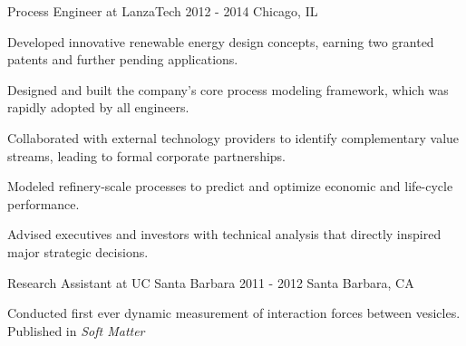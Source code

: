 \begin{cventries}
  \cventrynew
    {Process Engineer at LanzaTech} 
    {2012 - 2014} 
    {Chicago, IL} 
    {
      \begin{cvitems}
        \item {Developed innovative renewable energy design concepts, earning two granted patents and further pending applications.}
		\item {Designed and built the company's core process modeling framework, which was rapidly adopted by all engineers.}        
		\item {Collaborated with external technology providers to identify complementary value streams, leading to formal corporate partnerships.}
        \item {Modeled refinery-scale processes to predict and optimize economic and life-cycle performance.}        
        \item {Advised executives and investors with technical analysis that directly inspired major strategic decisions.}
      \end{cvitems}
    }
    
  \cventryshort
    {Research Assistant at UC Santa Barbara}
    {2011 - 2012}
    {Santa Barbara, CA}         
    {
      \begin{cvitems} 
        \item {Conducted first ever dynamic measurement of interaction forces between vesicles. Published in \emph{Soft Matter}}        
      \end{cvitems}
    }   
  



\end{cventries}
